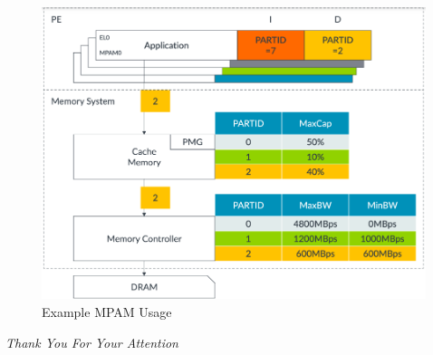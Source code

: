 \documentclass{beamer}
\begin{document}
\begin{frame}
    \begin{figure}
        \centering
        \includegraphics[width=0.80\columnwidth]{mpam.png}
        \caption{Example MPAM Usage}
        \label{fig:MPAM}
    \end{figure}
\end{frame}

\begin{frame}
  \centering \Large
  \emph{Thank You For Your Attention}
\end{frame}
\end{document}
